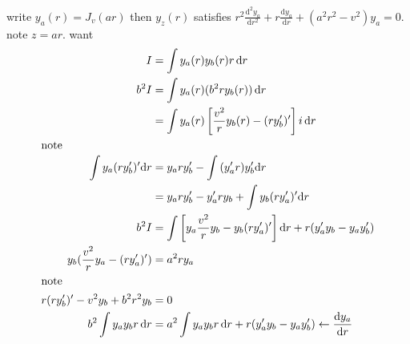 \documentclass{article}
\begin{document}
write $y_a(r)=J_v(ar)$ then $y_z(r)$ satisfies $r^2\frac{\mathrm{d}^2y_a}{\mathrm{d}r^2}+r\frac{\mathrm{d}y_a}{\mathrm{d}r}+(a^2r^2-v^2)y_a=0$. note $z=ar$. want
\begin{align*}
  I&=\int{y_a(r)y_b(r)r\,\mathrm{d}r}\\
  b^2I&=\int{y_a(r)(b^2ry_b(r))\,\mathrm{d}r}\\
  &=\int{y_a(r)\left[\frac{v^2}{r}y_b(r)-(ry_b')'\right]i\,\mathrm{d}r}\\
  \intertext{note}
  \int{y_a(ry_b')'\mathrm{d}r}&=y_ary_b'-\int{(y_a'r)y_b'\mathrm{d}r}\\
  &=y_ary_b'-y_a'ry_b+\int{y_b(ry_a')'\mathrm{d}r}\\
  b^2I&=\int{\left[y_a\frac{v^2}{r}y_b-y_b(ry_a')'\right]\mathrm{d}r}+r(y_a'y_b-y_ay_b')\\
  y_b(\frac{v^2}{r}y_a-(ry_a')')&=a^2ry_a\\
  \intertext{note}
  r(ry_b')'-v^2y_b+b^2r^2y_b&=0\\
  b^2\int{y_ay_br\,\mathrm{d}r}&=a^2\int{y_ay_br\,\mathrm{d}r}+r(y_a'y_b-y_ay_b')\leftarrow\frac{\mathrm{d}y_a}{\mathrm{d}r}

\end{align*}
\end{document}
